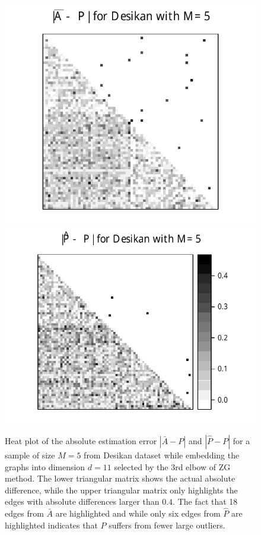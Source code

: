 \documentclass[10pt,letterpaper]{article}
\begin{document}
\begin{figure}

\begin{center}
  \includegraphics[height=.4\linewidth]{Diff2_desikan_m5.pdf}\hspace{-12pt}
  \includegraphics[height=.4\linewidth]{Diff3_desikan_m5.pdf}
\end{center}

\caption{Heat plot of the absolute estimation error $|\bar{A} - P|$ and $|\hat{P} - P|$ for a sample of size $M=5$ from Desikan dataset while embedding the graphs into dimension $d=11$ selected by the 3rd elbow of ZG method. The lower triangular matrix shows the actual absolute difference, while the upper triangular matrix only highlights the edges with absolute differences larger than $0.4$. The fact that 18 edges from $\bar{A}$ are highlighted and while only six edges from $\hat{P}$ are highlighted indicates that $\hat{P}$ suffers from fewer large outliers.}
\label{fig:Diff_desikan_m5}
\end{figure}
\end{document}
